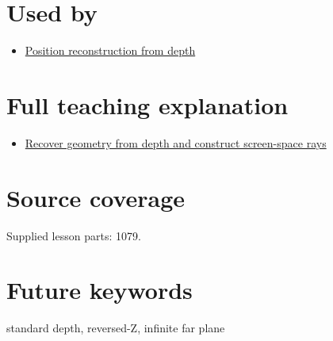 \section{Used by}\label{appendix-1bc40b08db4a-used-by}

\begin{itemize}
\tightlist
\item
  \hyperref[appendix-2cbf2968e866]{Position reconstruction from depth}
\end{itemize}

\section{Full teaching explanation}\label{appendix-1bc40b08db4a-full-teaching-explanation}

\begin{itemize}
\tightlist
\item
  \href{Continuous\%20Notes/Computing\%20Foundations\%20-\%20From\%20Bits\%20to\%20C++\%20and\%20Systems\%20APIs\#Recover\%20geometry\%20from\%20depth\%20and\%20construct\%20screen-space\%20rays}{Recover geometry from depth and construct screen-space rays}
\end{itemize}

\section{Source coverage}\label{appendix-1bc40b08db4a-source-coverage}

Supplied lesson parts: 1079.

\section{Future keywords}\label{appendix-1bc40b08db4a-future-keywords}

standard depth, reversed-Z, infinite far plane
